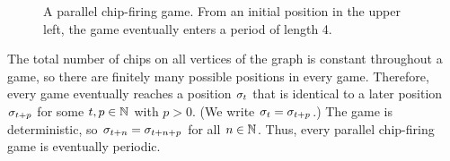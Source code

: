 \begin{figure}[h]
\centering
{}
\caption{A parallel chip-firing game. From an initial position in the upper
  left, the game eventually enters a period of length 4.}
\label{example}
\end{figure}

The total number of chips on all vertices of the graph is constant throughout a
game, so there are finitely many possible positions in every game. Therefore,
every game eventually reaches a position $\sigma_{t}$ that is identical to a later
position $\sigma_{t+p}$ for some $t,p \in \mathbb{N}$ with $p > 0$. (We write $\sigma_{t}
= \sigma_{t+p}$.) The game is deterministic, so $\sigma_{t+n} = \sigma_{t+n+p}$ for all
$n \in \mathbb{N}$. Thus, every parallel chip-firing game is eventually periodic.

